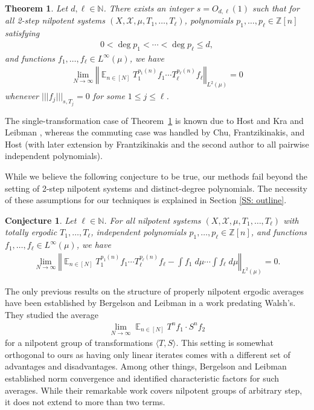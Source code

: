 \documentclass[11pt]{amsart}
\newtheorem{theorem}[lemma]{Theorem}
\newtheorem{conjecture}[lemma]{Conjecture}
\theoremstyle{definition}
\DeclareMathOperator*{\E}{\mathbb{E}}
\newcommand{\N}{{\mathbb N}}
\newcommand{\Z}{{\mathbb Z}}
\newcommand{\CX}{{\mathcal X}}
\newcommand{\norm}[1]{\left\Vert #1\right\Vert}
\newcommand{\nnorm}[1]{\lvert\!|\!| #1|\!|\!\rvert}
\newcommand{\1}{{\mathbf{1}}}
\begin{document}
\begin{theorem}\label{T: nilpotent seminorm estimates}
    Let $d,\ell\in\N$. There exists an integer $s=O_{d,\ell}(1)$ such that for all 2-step nilpotent systems $(X, \CX, \mu, T_1, \ldots, T_\ell)$, polynomials $p_1, \ldots, p_\ell\in\Z[n]$ satisfying
    \begin{align*}
        0<\deg p_1 < \cdots < \deg p_\ell \leq d,
    \end{align*}
    and functions $f_1, \ldots, f_\ell\in L^\infty(\mu)$, we have
    \begin{align}
    \lim_{N\to\infty}\norm{\E_{n\in[N]}T_1^{p_1(n)}f_1\cdots T_\ell^{p_\ell(n)}f_\ell}_{L^2(\mu)} = 0
\end{align}
whenever $\nnorm{f_j}_{s,T_j} = 0$ for some $1\leq j\leq \ell$.
\end{theorem}
The single-transformation case of Theorem~\ref{T: nilpotent seminorm estimates} is known due to Host and Kra \cite{HK05b} and Leibman \cite{L05a}, whereas the commuting case was handled by Chu, Frantzikinakis, and Host \cite{CFH11} (with later extension by Frantzikinakis and the second author \cite{FrKu22a} to all pairwise independent polynomials).

While we believe the following conjecture to be true, our methods fail beyond the setting of 2-step nilpotent systems and distinct-degree polynomials. The necessity of these assumptions for our techniques is explained in Section \ref{SS: outline}.
\begin{conjecture}\label{C: main conjecture}
     Let $\ell\in\N$. For all nilpotent systems $(X, \CX, \mu, T_1, \ldots, T_\ell)$ with totally ergodic $T_1, \ldots, T_\ell$, independent polynomials $p_1, \ldots, p_\ell\in\Z[n]$, and functions $f_1, \ldots, f_\ell\in L^\infty(\mu)$, we have
    \begin{align}
    \lim_{N\to\infty}\norm{\E_{n\in[N]}T_1^{p_1(n)}f_1\cdots T_\ell^{p_\ell(n)}f_\ell - \int f_1\; d\mu\cdots \int f_\ell\; d\mu}_{L^2(\mu)} = 0.
\end{align}
\end{conjecture}
The only previous results on the structure of properly nilpotent ergodic averages have been established by Bergelson and Leibman \cite{BL02} in a work predating Walsh's. They studied the average
\begin{align}\label{E: BL average}
    \lim_{N\to\infty}\E_{n\in[N]}T^n f_1 \cdot S^n f_2
\end{align}
for a nilpotent group of transformations $\langle T, S\rangle$. This setting is somewhat orthogonal to ours as having only linear iterates comes with a different set of advantages and disadvantages. Among other things, Bergelson and Leibman established norm convergence and identified characteristic factors for such averages. While their remarkable work covers nilpotent groups of arbitrary step, it does not extend to more than two terms.  
\end{document}
